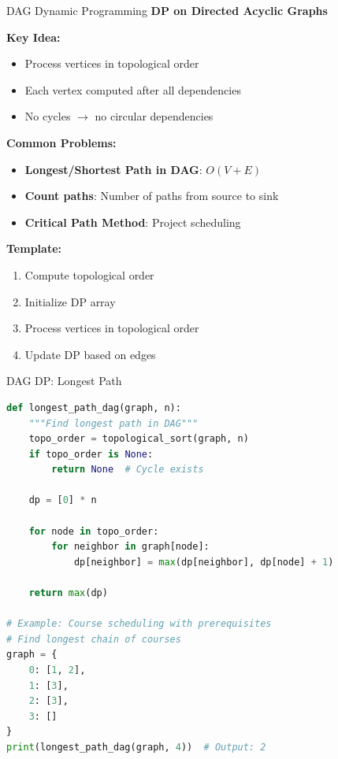 \documentclass[aspectratio=169]{beamer}
\begin{document}
\begin{frame}{DAG Dynamic Programming}
  \textbf{DP on Directed Acyclic Graphs}

  \vspace{0.3cm}
  \textbf{Key Idea:}
  \begin{itemize}
    \item Process vertices in topological order
    \item Each vertex computed after all dependencies
    \item No cycles $\rightarrow$ no circular dependencies
  \end{itemize}

  \vspace{0.3cm}
  \textbf{Common Problems:}
  \begin{itemize}
    \item \textbf{Longest/Shortest Path in DAG}: $O(V + E)$
    \item \textbf{Count paths}: Number of paths from source to sink
    \item \textbf{Critical Path Method}: Project scheduling
  \end{itemize}

  \vspace{0.3cm}
  \textbf{Template:}
  \begin{enumerate}
    \item Compute topological order
    \item Initialize DP array
    \item Process vertices in topological order
    \item Update DP based on edges
  \end{enumerate}
\end{frame}

\begin{frame}[fragile]{DAG DP: Longest Path}
\begin{lstlisting}[language=Python, basicstyle=\ttfamily\small]
def longest_path_dag(graph, n):
    """Find longest path in DAG"""
    topo_order = topological_sort(graph, n)
    if topo_order is None:
        return None  # Cycle exists

    dp = [0] * n

    for node in topo_order:
        for neighbor in graph[node]:
            dp[neighbor] = max(dp[neighbor], dp[node] + 1)

    return max(dp)

# Example: Course scheduling with prerequisites
# Find longest chain of courses
graph = {
    0: [1, 2],
    1: [3],
    2: [3],
    3: []
}
print(longest_path_dag(graph, 4))  # Output: 2
\end{lstlisting}
\end{frame}
\end{document}

